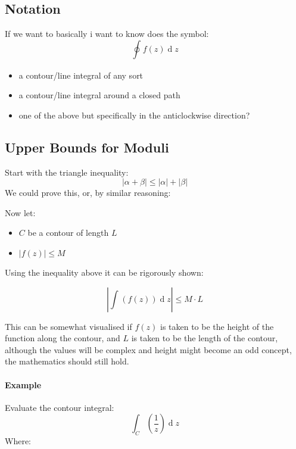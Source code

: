 \documentclass[class=article, crop=false]{standalone}
\begin{document}
\hypertarget{notation}{%
\subsection{Notation}\label{notation}}

If we want to basically i want to know does the symbol:
\[\oint^{}_{} f\left( z \right)   \operatorname{d}z\]

\begin{itemize}
\item
  a contour/line integral of any sort
\item
  a contour/line integral around a closed path
\item
  one of the above but specifically in the anticlockwise direction?
\end{itemize}

\hypertarget{upper-bounds-for-moduli}{%
\subsection{Upper Bounds for Moduli}\label{upper-bounds-for-moduli}}

Start with the triangle inequality:
\[\left| \alpha + \beta \right| \leq     \left| \alpha \right| +     \left| \beta \right|\]
We could prove this, or, by similar reasoning:

Now let:

\begin{itemize}
\item
  \(C\) be a contour of length \(L\)
\item
  \(\left| f\left( z \right) \right| \leq M\)
\end{itemize}

Using the inequality above it can be rigorously shown:

\[\left| \int^{}_{}\left( f\left( z \right)  \right) \operatorname{d}z  \right| \leq M\cdot L\]

This can be somewhat visualised if \(f\left( z \right)\) is taken to be
the height of the function along the contour, and \(L\) is taken to be
the length of the contour, although the values will be complex and
height might become an odd concept, the mathematics should still hold.

\hypertarget{example}{%
\paragraph{Example}\label{example}}

Evaluate the contour integral:
\[\int^{}_{C}\left( \frac{1}{z} \right) \operatorname{d}z\] Where:
\end{document}
